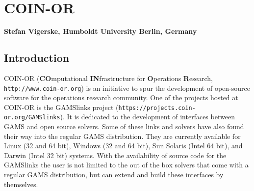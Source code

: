 \renewenvironment{option_tabular}%
{\begin{tabular}{p{.16\textwidth}p{.65\textwidth}p{.11\textwidth}}
\hline
\textbf{Option}      &
\textbf{Description} &
\textbf{Default}     \\
\hline}
{\end{tabular}}

\renewenvironment{tab_list}[1]%
{\begin{list}{}{\vspace*{-1.5ex}\renewcommand{\makelabel}{\desclabel}\parsep-0.15cm\labelwidth#1\leftmargin#1\setlength{\labelsep}{\itemindent}\topsep0cm\parskip0cm\partopsep0cm}}%
{\end{list}}


\chapter{COIN-OR}
\textbf{Stefan Vigerske, Humboldt University Berlin, Germany}
\vspace{1cm}

\minitoc


\section{Introduction}

COIN-OR (\textbf{CO}mputational \textbf{IN}frastructure for \textbf{O}perations \textbf{R}esearch, \texttt{http://www.coin-or.org}) is an initiative to spur the development of open-source software for the operations research community.
One of the projects hosted at COIN-OR is the GAMSlinks project (\texttt{https://projects.coin-or.org/GAMSlinks}).
It is dedicated to the development of interfaces between GAMS and open source solvers.
Some of these links and solvers have also found their way into the regular GAMS distribution.
They are currently available for Linux (32 and 64 bit), Windows (32 and 64 bit), Sun Solaris (Intel 64 bit), and Darwin (Intel 32 bit) systems.
With the availability of source code for the GAMSlinks the user is not limited to the out of the box solvers that come with a regular GAMS distribution, but can extend and build these interfaces by themselves.

